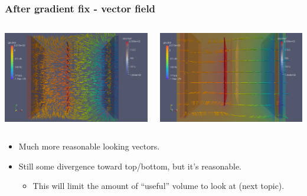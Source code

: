 \documentclass[xcolor=dvipsnames]{beamer}
\begin{document}
\begin{frame}
  \frametitle{After gradient fix - vector field}
  \begin{columns}
    \begin{column}{0.5\textwidth}
      \includegraphics[width=\textwidth]{twodee-fine-arrows-plan-fixgrad.png}      
    \end{column}
    \begin{column}{0.5\textwidth}
      \includegraphics[width=\textwidth]{twodee-fine-arrows-side-fixgrad.png}      
    \end{column}
  \end{columns}
  \footnotesize
  \begin{itemize}
  \item Much more reasonable looking vectors.
  \item Still some divergence toward top/bottom, but it's reasonable.
    \begin{itemize}\scriptsize
    \item This will limit the amount of ``useful'' volume to look at (next topic).
    \end{itemize}
  \end{itemize}
\end{frame}
\end{document}
